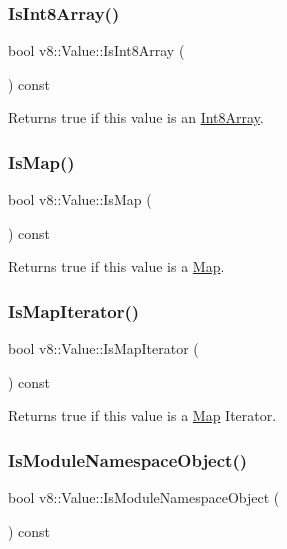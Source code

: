 \subsubsection{\texorpdfstring{Is\+Int8\+Array()}{IsInt8Array()}}
{\footnotesize\ttfamily bool v8\+::\+Value\+::\+Is\+Int8\+Array (\begin{DoxyParamCaption}{ }\end{DoxyParamCaption}) const}

Returns true if this value is an \mbox{\hyperlink{classv8_1_1Int8Array}{Int8\+Array}}. \mbox{\label{classv8_1_1Value_a85e4e8455cbd60c9b0a1dc91030383e6}} 
\subsubsection{\texorpdfstring{Is\+Map()}{IsMap()}}
{\footnotesize\ttfamily bool v8\+::\+Value\+::\+Is\+Map (\begin{DoxyParamCaption}{ }\end{DoxyParamCaption}) const}

Returns true if this value is a \mbox{\hyperlink{classv8_1_1Map}{Map}}. \mbox{\label{classv8_1_1Value_a761b2fd0aa8c2f59c879741336eb2f66}} 
\subsubsection{\texorpdfstring{Is\+Map\+Iterator()}{IsMapIterator()}}
{\footnotesize\ttfamily bool v8\+::\+Value\+::\+Is\+Map\+Iterator (\begin{DoxyParamCaption}{ }\end{DoxyParamCaption}) const}

Returns true if this value is a \mbox{\hyperlink{classv8_1_1Map}{Map}} Iterator. \mbox{\label{classv8_1_1Value_aa6c9cb065da30b0b58b929ecaa80a1ab}} 
\subsubsection{\texorpdfstring{Is\+Module\+Namespace\+Object()}{IsModuleNamespaceObject()}}
{\footnotesize\ttfamily bool v8\+::\+Value\+::\+Is\+Module\+Namespace\+Object (\begin{DoxyParamCaption}{ }\end{DoxyParamCaption}) const}

